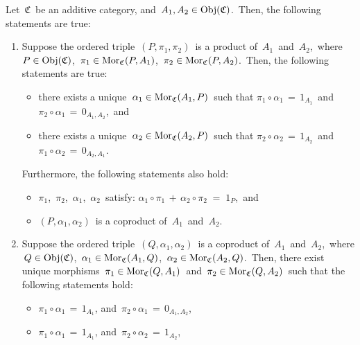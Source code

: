 \vskip 0.5cm
\begin{proposition}
\mbox{}
\vskip 0.15cm
\noindent
Let \,$\mathfrak{C}$\, be an additive category, and \,$A_{1}, A_{2} \in \textnormal{Obj}(\mathfrak{C})$.\,
Then, the following statements are true:
\begin{enumerate}
\item
	Suppose the ordered triple \,$(P,\pi_{1},\pi_{2})$\, is a product of \,$A_{1}$\, and \,$A_{2}$,\,
	where \,$P \in \textnormal{Obj}(\mathfrak{C})$, \,$\pi_{1} \in \textnormal{Mor}_{\mathfrak{C}}(P,A_{1})$, \,$\pi_{2} \in \textnormal{Mor}_{\mathfrak{C}}(P,A_{2})$.\,
	Then, the following statements are true:
	\begin{itemize}
	\item
		there exists a unique
		\,$\alpha_{1} \in \textnormal{Mor}_{\mathfrak{C}}(A_{1},P)$\,
		such that
		\;$\pi_{1} \circ \alpha_{1} \,=\, 1_{A_{1}}$\, and \;$\pi_{2} \circ \alpha_{1} \,=\, 0_{A_{1},A_{2}}$,\, and
	\item
		there exists a unique
		\,$\alpha_{2} \in \textnormal{Mor}_{\mathfrak{C}}(A_{2},P)$\,
		such that
		\;$\pi_{2} \circ \alpha_{2} \,=\, 1_{A_{2}}$\, and \;$\pi_{1} \circ \alpha_{2} \,=\, 0_{A_{2},A_{1}}$.\,
	\end{itemize}
	Furthermore, the following statements also hold:
	\begin{itemize}
	\item
		$\pi_{1}$, \,$\pi_{2}$, \,$\alpha_{1}$, \,$\alpha_{2}$\, satisfy:
		\;$\alpha_{1} \circ \pi_{1} \,+\, \alpha_{2} \circ \pi_{2} \; = \; 1_{P}$,\, and
	\item
		$(P,\alpha_{1},\alpha_{2})$\, is a coproduct of \,$A_{1}$\, and \,$A_{2}$.\,
	\end{itemize}
\item
	Suppose the ordered triple \,$(Q,\alpha_{1},\alpha_{2})$\, is a coproduct of \,$A_{1}$\, and \,$A_{2}$,\,
	where
	\,$Q \in \textnormal{Obj}(\mathfrak{C})$,
	\,$\alpha_{1} \in \textnormal{Mor}_{\mathfrak{C}}(A_{1},Q)$,
	\,$\alpha_{2} \in \textnormal{Mor}_{\mathfrak{C}}(A_{2},Q)$.\,
	Then, there {\color{red}exist unique} morphisms
	\,$\pi_{1} \in \textnormal{Mor}_{\mathfrak{C}}(Q,A_{1})$\, and \,$\pi_{2} \in \textnormal{Mor}_{\mathfrak{C}}(Q,A_{2})$\,
	such that the following statements hold:
	\begin{itemize}
	\item
		$\pi_{1} \circ \alpha_{1} \,=\, 1_{A_{1}}$,\; and \,\;$\pi_{2} \circ \alpha_{1} \,=\, 0_{A_{1},A_{2}}$,\,
	\item
		$\pi_{1} \circ \alpha_{1} \,=\, 1_{A_{1}}$,\; and \,\;$\pi_{2} \circ \alpha_{2} \,=\, 1_{A_{2}}$,\,

\end{itemize}
\end{enumerate}
\end{proposition}
